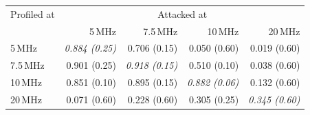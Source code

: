 \begin{tabular}{lrrrr}
\hline
Profiled at & \multicolumn{4}{c}{Attacked at} \\
 & 5\,MHz & 7.5\,MHz & 10\,MHz & 20\,MHz \\
\hline
5\,MHz & \textit{0.884 {\tiny (0.25)}} & 0.706 {\tiny (0.15)} & 0.050 {\tiny (0.60)} & 0.019 {\tiny (0.60)} \\
7.5\,MHz & 0.901 {\tiny (0.25)} & \textit{0.918 {\tiny (0.15)}} & 0.510 {\tiny (0.10)} & 0.038 {\tiny (0.60)} \\
10\,MHz & 0.851 {\tiny (0.10)} & 0.895 {\tiny (0.15)} & \textit{0.882 {\tiny (0.06)}} & 0.132 {\tiny (0.60)} \\
20\,MHz & 0.071 {\tiny (0.60)} & 0.228 {\tiny (0.60)} & 0.305 {\tiny (0.25)} & \textit{0.345 {\tiny (0.60)}} \\
\hline
\end{tabular}
